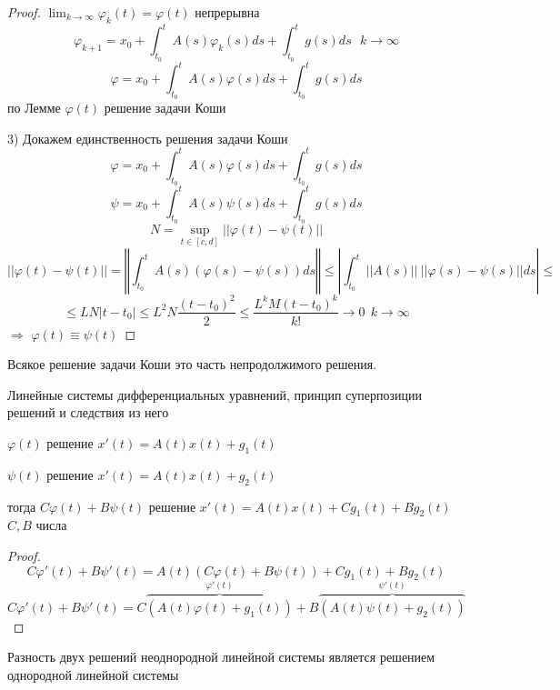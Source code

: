 \begin{proof}
  $\lim_{k \to \infty} \varphi_k(t) = \varphi(t)$ непрерывна
  $$
  \varphi_{k+1} = x_0 + \int_{t_0}^t A(s) \varphi_k(s) ds + \int_{t_0}^t g(s)ds
  ~~~ k \to \infty
  $$
  $$
  \varphi = x_0 + \int_{t_0}^t A(s) \varphi(s) ds + \int_{t_0}^t g(s)ds
  $$
  по Лемме $\varphi(t)$ решение задачи Коши

  3) Докажем единственность решения задачи Коши
  $$
  \varphi = x_0 + \int_{t_0}^t A(s) \varphi(s) ds + \int_{t_0}^t g(s)ds
  $$
  $$
  \psi = x_0 + \int_{t_0}^t A(s) \psi(s) ds + \int_{t_0}^t g(s)ds
  $$
  $$
  N = \sup_{t \in [c,d]} ||\varphi(t) - \psi(t)||
  $$
  $$
  ||\varphi(t) - \psi(t)|| = \left\Vert\int_{t_0}^t A(s)
  (\varphi(s) - \psi(s))ds \right\Vert \le \left| \int_{t_0}^t ||A(s)|| ~
  ||\varphi(s) - \psi(s)||ds \right| \le
  $$
  $$
  \le LN|t-t_0| \le L^2 N \frac{(t - t_0)^2}{2} \le
  \frac{L^k M (t - t_0)^k}{k!} \to 0 ~~ k \to \infty
  $$
  $\Rightarrow$ $\varphi(t) \equiv \psi(t)$
\end{proof}

\begin{theorem}
  Всякое решение задачи Коши это часть непродолжимого решения.
\end{theorem}

\begin{title}[\Large]
  Линейные системы дифференциальных уравнений, принцип суперпозиции решений и
  следствия из него
\end{title}

\begin{theorem}
  $\varphi(t)$ решение $x'(t) = A(t)x(t) + g_1(t)$

  $\psi(t)$ решение $x'(t) = A(t)x(t) + g_2(t)$

  тогда $C\varphi(t) + B\psi(t)$ решение $x'(t) = A(t)x(t) + Cg_1(t) + Bg_2(t)$
  $C,B$ числа
\end{theorem}

\begin{proof}
  $$
  C\varphi'(t) + B\psi'(t) = A(t)(C\varphi(t) + B\psi(t)) + Cg_1(t) +
  Bg_2(t)
  $$
  $$
  C\varphi'(t) + B\psi'(t) =
  C \overbrace{(A(t)\varphi(t) + g_1(t))}^{\varphi'(t)}+
  B \overbrace{(A(t)\psi(t) + g_2(t))}^{\psi'(t)}
  $$
\end{proof}

\begin{block}[Следствие 1]
  Разность двух решений неоднородной линейной системы является решением
  однородной линейной системы
\end{block}

